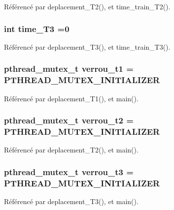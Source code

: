 Référencé par deplacement\+\_\+\+T2(), et time\+\_\+train\+\_\+\+T2().

\subsubsection[{time\+\_\+\+T3}]{\setlength{\rightskip}{0pt plus 5cm}int time\+\_\+\+T3 =0}\label{thread_8h_a1c1f57fea3191ead973c49e64e089547}


Référencé par deplacement\+\_\+\+T3(), et time\+\_\+train\+\_\+\+T3().

\subsubsection[{verrou\+\_\+t1}]{\setlength{\rightskip}{0pt plus 5cm}pthread\+\_\+mutex\+\_\+t verrou\+\_\+t1 = P\+T\+H\+R\+E\+A\+D\+\_\+\+M\+U\+T\+E\+X\+\_\+\+I\+N\+I\+T\+I\+A\+L\+I\+Z\+ER}\label{thread_8h_a73cc448791fbdabdf0dbeb4f9dc6e342}


Référencé par deplacement\+\_\+\+T1(), et main().

\subsubsection[{verrou\+\_\+t2}]{\setlength{\rightskip}{0pt plus 5cm}pthread\+\_\+mutex\+\_\+t verrou\+\_\+t2 = P\+T\+H\+R\+E\+A\+D\+\_\+\+M\+U\+T\+E\+X\+\_\+\+I\+N\+I\+T\+I\+A\+L\+I\+Z\+ER}\label{thread_8h_ae110f945befa6401121aaa8d1cc594db}


Référencé par deplacement\+\_\+\+T2(), et main().

\subsubsection[{verrou\+\_\+t3}]{\setlength{\rightskip}{0pt plus 5cm}pthread\+\_\+mutex\+\_\+t verrou\+\_\+t3 = P\+T\+H\+R\+E\+A\+D\+\_\+\+M\+U\+T\+E\+X\+\_\+\+I\+N\+I\+T\+I\+A\+L\+I\+Z\+ER}\label{thread_8h_a22553aa0835b7a564bf85e1a71802d05}


Référencé par deplacement\+\_\+\+T3(), et main().

